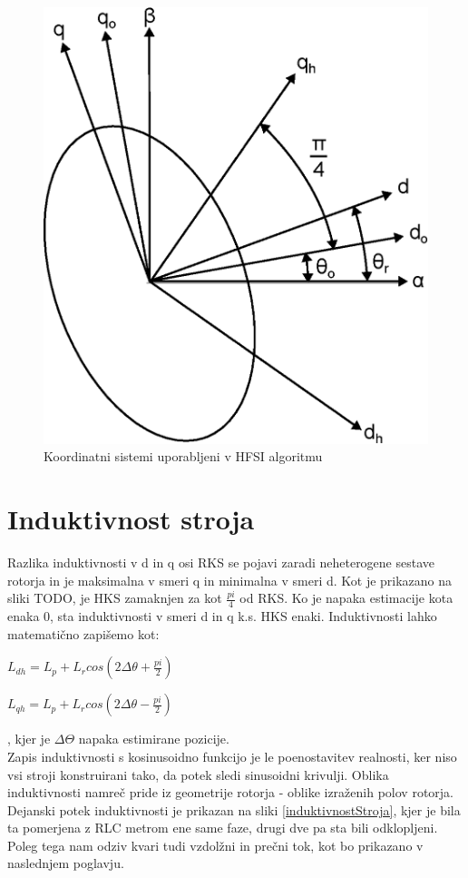 \documentclass[a4paper,twoside,openright,12pt,slovene]{book}
\begin{document}
\begin{figure}[!htbp]
    \centering
    \includegraphics[width=0.75\columnwidth]{Slike/Inkscape/koordinatniSistem.eps}
    \caption{\label{koordinatniSistem} Koordinatni sistemi uporabljeni v HFSI algoritmu}
\end{figure}

\section{Induktivnost stroja}
Razlika induktivnosti v d in q osi RKS se pojavi zaradi neheterogene sestave rotorja in je maksimalna v smeri q in minimalna v smeri d. Kot je prikazano na sliki TODO, je
HKS zamaknjen za kot $\frac{pi}{4}$ od RKS. Ko je napaka estimacije kota enaka 0, sta induktivnosti v smeri d in q k.s. HKS enaki. Induktivnosti lahko matematično zapišemo kot:

\begin{center}
    $L_{dh} = L_p + L_r cos(2\Delta\theta + \frac{pi}{2})$

    $L_{qh} = L_p + L_r cos(2\Delta\theta - \frac{pi}{2})$
\end{center}

, kjer je $\Delta\Theta$ napaka estimirane pozicije.
\\
Zapis induktivnosti s kosinusoidno funkcijo je le poenostavitev realnosti, ker niso vsi stroji konstruirani tako, da potek sledi sinusoidni krivulji. Oblika induktivnosti namreč pride iz geometrije
rotorja - oblike izraženih polov rotorja. Dejanski potek induktivnosti je prikazan na sliki \ref{induktivnostStroja}, kjer je bila ta pomerjena z RLC metrom ene same faze, drugi dve pa sta bili
odklopljeni. Poleg tega nam odziv kvari tudi vzdolžni in prečni tok, kot bo prikazano v naslednjem poglavju.
\end{document}
